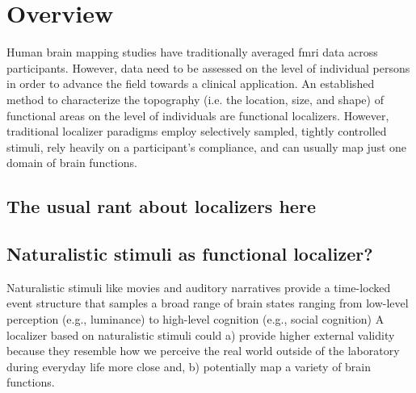 
\section{Overview}




Human brain mapping studies have traditionally averaged \ac{fmri} data across
participants.
%
However, data need to be assessed on the level of individual persons in order to
advance the field towards a clinical application.
An established method to characterize the topography (i.e. the location, size,
and shape) of functional areas on the level of individuals are functional
localizers.
However, traditional localizer paradigms employ selectively sampled, tightly
controlled stimuli, rely heavily on a participant's compliance, and can usually
map just one domain of brain functions.


\subsection{The usual rant about localizers here}





\subsection{Naturalistic stimuli as functional localizer?}


Naturalistic stimuli like movies and auditory narratives \citep[cf.][for
reviews]{jaaskelainen2021movies, jaaskelainen2020neural} provide a time-locked
event structure that samples a broad range of brain states ranging from
low-level perception (e.g., luminance) to high-level cognition (e.g., social
cognition)
%
A localizer based on naturalistic stimuli could
%
a) provide higher external validity because they resemble how we perceive the
real world outside of the laboratory during everyday life more close and,
%
b) potentially map a variety of brain functions.

